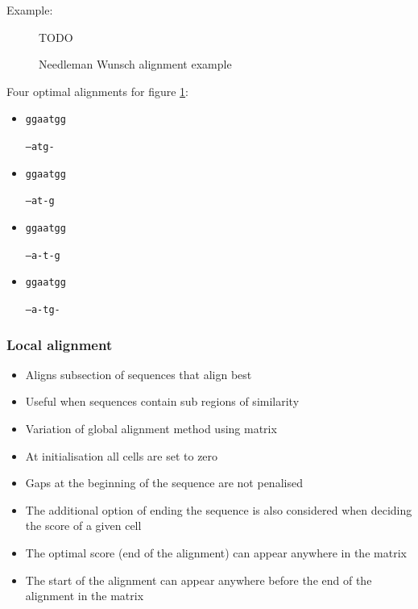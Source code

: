 \documentclass[a4paper]{article}
\begin{document}
Example:

\begin{figure}[h!]
  \centering
  TODO
  \caption{Needleman Wunsch alignment example}
  \label{fig:nw_alignment_eg}
\end{figure}
\FloatBarrier

Four optimal alignments for figure \ref{fig:nw_alignment_eg}:

\begin{itemize}
  \item
    \texttt{ggaatgg}

    \texttt{---atg-}

  \item
    \texttt{ggaatgg}

    \texttt{---at-g}

  \item
    \texttt{ggaatgg}

    \texttt{--a-t-g}

  \item
    \texttt{ggaatgg}

    \texttt{--a-tg-}
\end{itemize}

\subsubsection{Local alignment}

\begin{itemize}
  \item
    Aligns subsection of sequences that align best

  \item
    Useful when sequences contain sub regions of similarity
\end{itemize}


\begin{itemize}
  \item
    Variation of global alignment method using matrix

  \item
    At initialisation all cells are set to zero

  \item
    Gaps at the beginning of the sequence are not penalised

  \item
    The additional option of ending the sequence is also considered when
    deciding the score of a given cell

  \item
    The optimal score (end of the alignment) can appear anywhere in the matrix

  \item
    The start of the alignment can appear anywhere before the end of the
    alignment in the matrix
\end{itemize}
\end{document}
